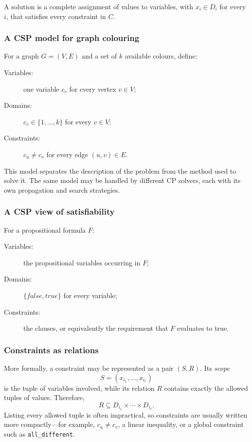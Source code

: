 \documentclass[11pt]{article}
\begin{document}
A solution is a complete assignment of values to variables, with
$x_i\in D_i$ for every $i$, that satisfies every constraint in $C$.

\subsubsection{A CSP model for graph colouring}

For a graph $G=(V,E)$ and a set of $k$ available colours, define:
\begin{description}
    \item[Variables:] one variable $c_v$ for every vertex $v\in V$;
    \item[Domains:] $c_v\in\{1,\ldots,k\}$ for every $v\in V$;
    \item[Constraints:] $c_u\neq c_v$ for every edge $(u,v)\in E$.
\end{description}

This model separates the description of the problem from the method used to
solve it. The same model may be handled by different CP solvers, each with its
own propagation and search strategies.

\subsubsection{A CSP view of satisfiability}

For a propositional formula $F$:
\begin{description}
    \item[Variables:] the propositional variables occurring in $F$;
    \item[Domains:] $\{\mathit{false},\mathit{true}\}$ for every variable;
    \item[Constraints:] the clauses, or equivalently the requirement that
    $F$ evaluates to true.
\end{description}

\subsubsection{Constraints as relations}

More formally, a constraint may be represented as a pair $(S,R)$. Its
\emph{scope}
\[
    S=(x_{i_1},\ldots,x_{i_r})
\]
is the tuple of variables involved, while its relation $R$ contains exactly the
allowed tuples of values. Therefore,
\[
    R\subseteq D_{i_1}\times\cdots\times D_{i_r}.
\]
Listing every allowed tuple is often impractical, so constraints are usually
written more compactly---for example, $c_u\neq c_v$, a linear inequality, or a
global constraint such as \texttt{all\_different}.
\end{document}
